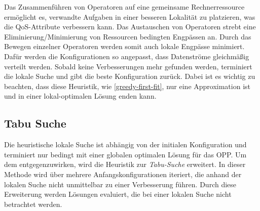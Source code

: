 \documentclass{article}
\begin{document}
Das Zusammenführen von Operatoren auf eine gemeinsame Rechnerressource ermöglicht es, verwandte Aufgaben in einer besseren Lokalität zu platzieren, 
was die QoS-Attribute verbessern kann. 
Das Austauschen von Operatoren strebt eine Eliminierung/Minimierung von Ressourcen bedingten Engpässen an. 
Durch das Bewegen einzelner Operatoren werden somit auch lokale Engpässe minimiert. 
Dafür werden die Konfigurationen so angepasst, dass Datenströme gleichmäßig verteilt werden. 
Sobald keine Verbesserungen mehr gefunden werden, terminiert die lokale Suche und gibt die beste Konfiguration zurück. 
Dabei ist es wichtig zu beachten, dass diese Heuristik, wie \ref{greedy-first-fit}, nur eine Approximation ist und in einer lokal-optimalen Lösung enden kann.

 

\subsection{Tabu Suche}
Die heuristische lokale Suche ist abhängig von der initialen Konfiguration und terminiert nur bedingt 
mit einer globalen optimalen Lösung für das OPP. Um dem entgegenzuwirken, 
wird die Heuristik zur \textit{Tabu-Suche} \cite{glover-tabu-search} erweitert. 
In dieser Methode wird über mehrere Anfangskonfigurationen iteriert, die anhand der lokalen Suche nicht unmittelbar zu einer Verbesserung führen. 
Durch diese Erweiterung werden Lösungen evaluiert, die bei einer lokalen Suche nicht betrachtet werden.
\end{document}
